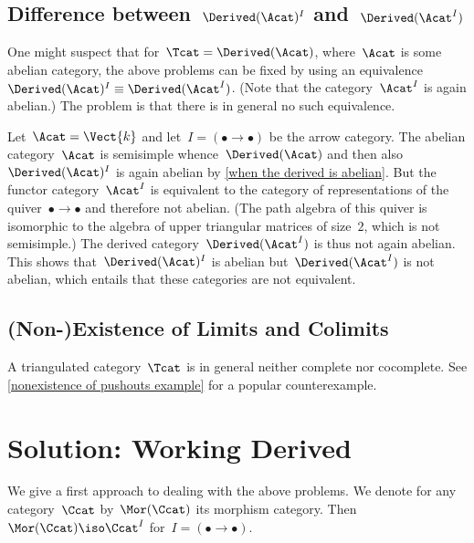 \documentclass[a4paper,10pt]{scrartcl}
\begin{document}
\subsection{Difference between~$\Derived(\Acat)^I$ and~$\Derived(\Acat^I)$}

One might suspect that for~$\Tcat = \Derived(\Acat)$, where~$\Acat$ is some abelian category, the above problems can be fixed by using an equivalence~$\Derived(\Acat)^I \equiv \Derived(\Acat^I)$.
(Note that the category~$\Acat^I$ is again abelian.)
The problem is that there is in general no such equivalence.

\begin{example}
  \label{example different derived}
  Let~$\Acat = \Vect{k}$ and let~$I = (\bullet \to \bullet)$ be the arrow category.
  The abelian category~$\Acat$ is semisimple whence~$\Derived(\Acat)$ and then also~$\Derived(\Acat)^I$ is again abelian by \cref{when the derived is abelian}.
  But the functor category~$\Acat^I$ is equivalent to the category of representations of the quiver~$\bullet \to \bullet$ and therefore not abelian.
  (The path algebra of this quiver is isomorphic to the algebra of upper triangular matrices of size~$2$, which is not semisimple.)
  The derived category~$\Derived(\Acat^I)$ is thus not again abelian.
  This shows that~$\Derived(\Acat)^I$ is abelian but~$\Derived(\Acat^I)$ is not abelian, which entails that these categories are not equivalent.
\end{example}


\subsection{(Non-)Existence of Limits and Colimits}
\label{nonexistence of pushouts}

A triangulated category~$\Tcat$ is in general neither complete nor cocomplete.
See \cref{nonexistence of pushouts example} for a popular counterexample.





\section{Solution: Working Derived}

We give a first approach to dealing with the above problems.
We denote for any category~$\Ccat$ by~$\Mor(\Ccat)$ its morphism category.
Then~$\Mor(\Ccat) \iso \Ccat^I$ for~$I = (\bullet \to \bullet)$.
\end{document}

